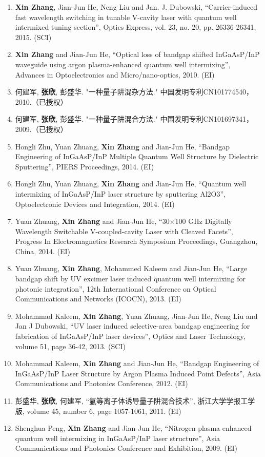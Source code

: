 \documentclass{ZJUthesis}
\begin{document}
\begin{publications}
\begin{enumerate}
\item{\textbf{Xin Zhang}, Jian-Jun He, Neng Liu and Jan. J. Dubowski, “Carrier-induced fast wavelength switching in tunable V-cavity laser with quantum well intermixed tuning section”, Optics Express, vol. 23, no. 20, pp. 26336-26341, 2015. (SCI)}
\item{\textbf{Xin Zhang} and Jian-Jun He, “Optical loss of bandgap shifted InGaAsP/InP waveguide using argon plasma-enhanced quantum well intermixing”, Advances in Optoelectronics and Micro/nano-optics, 2010. (EI)}
\item{何建军, \textbf{张欣}, 彭盛华. "一种量子阱混杂方法." 中国发明专利CN101774540，2010.（已授权）}
\item{何建军, \textbf{张欣}, 彭盛华. "一种量子阱混合方法." 中国发明专利CN101697341，2009.（已授权）}

\item{Hongli Zhu, Yuan Zhuang, \textbf{Xin Zhang} and Jian-Jun He, “Bandgap Engineering of InGaAsP/InP Multiple Quantum Well Structure by Dielectric Sputtering”, PIERS Proceedings, 2014. (EI)}
\item{Hongli Zhu, Yuan Zhuang, \textbf{Xin Zhang} and Jian-Jun He, “Quantum well intermixing of InGaAsP/InP laser structure by sputtering Al2O3”, Optoelectronic Devices and Integration, 2014. (EI)}
\item{Yuan Zhuang, \textbf{Xin Zhang} and Jian-Jun He, “30×100 GHz Digitally Wavelength Switchable V-coupled-cavity Laser with Cleaved Facets”, Progress In Electromagnetics Research Symposium Proceedings, Guangzhou, China, 2014. (EI)}
\item{Yuan Zhuang, \textbf{Xin Zhang}, Mohammed Kaleem and Jian-Jun He, “Large bandgap shift by UV excimer laser induced quantum well intermixing for photonic integration”, 12th International Conference on Optical Communications and Networks (ICOCN), 2013. (EI)}
\item{Mohammad Kaleem, \textbf{Xin Zhang}, Yuan Zhuang, Jian-Jun He, Neng Liu and Jan J Dubowski, “UV laser induced selective-area bandgap engineering for fabrication of InGaAsP/InP laser devices”, Optics and Laser Technology, volume 51, page 36-42, 2013. (SCI)}
\item{Mohammad Kaleem, \textbf{Xin Zhang} and Jian-Jun He, “Bandgap Engineering of InGaAsP/InP Laser Structure by Argon Plasma Induced Point Defects”, Asia Communications and Photonics Conference, 2012. (EI)}
\item{彭盛华, \textbf{张欣}, 何建军, “氩等离子体诱导量子阱混合技术”, 浙江大学学报工学版, volume 45, number 6, page 1057-1061, 2011. (EI)}
\item{Shenghua Peng, \textbf{Xin Zhang} and Jian-Jun He, “Nitrogen plasma enhanced quantum well intermixing in InGaAsP/InP laser structure”, Asia Communications and Photonics Conference and Exhibition, 2009. (EI)}

\end{enumerate}
\end{publications}
\end{document}
